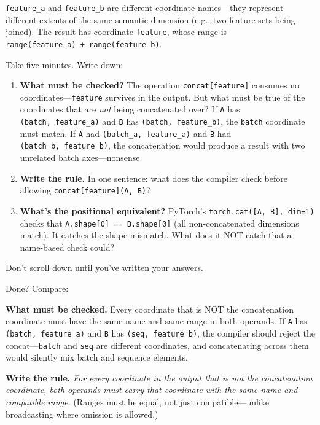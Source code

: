 \documentclass[11pt,titlepage]{article}
\begin{document}
\texttt{feature\_a} and \texttt{feature\_b} are different coordinate
names---they represent different extents of the same semantic dimension
(e.g., two feature sets being joined). The result has coordinate
\texttt{feature}, whose range is
\texttt{range(feature\_a)\ +\ range(feature\_b)}.

Take five minutes. Write down:

\begin{enumerate}
\def\labelenumi{\arabic{enumi}.}
\item
  \textbf{What must be checked?} The operation
  \texttt{concat{[}feature{]}} consumes no
  coordinates---\texttt{feature} survives in the output. But what must
  be true of the coordinates that are \emph{not} being concatenated
  over? If \texttt{A} has \texttt{(batch,\ feature\_a)} and \texttt{B}
  has \texttt{(batch,\ feature\_b)}, the \texttt{batch} coordinate must
  match. If \texttt{A} had \texttt{(batch\_a,\ feature\_a)} and
  \texttt{B} had \texttt{(batch\_b,\ feature\_b)}, the concatenation
  would produce a result with two unrelated batch axes---nonsense.
\item
  \textbf{Write the rule.} In one sentence: what does the compiler check
  before allowing \texttt{concat{[}feature{]}(A,\ B)}?
\item
  \textbf{What's the positional equivalent?} PyTorch's
  \texttt{torch.cat({[}A,\ B{]},\ dim=1)} checks that
  \texttt{A.shape{[}0{]}\ ==\ B.shape{[}0{]}} (all non-concatenated
  dimensions match). It catches the shape mismatch. What does it NOT
  catch that a name-based check could?
\end{enumerate}

Don't scroll down until you've written your answers.

\vspace{2em}

Done? Compare:

\textbf{What must be checked.} Every coordinate that is NOT the
concatenation coordinate must have the same name and same range in both
operands. If \texttt{A} has \texttt{(batch,\ feature\_a)} and \texttt{B}
has \texttt{(seq,\ feature\_b)}, the compiler should reject the
concat---\texttt{batch} and \texttt{seq} are different coordinates, and
concatenating across them would silently mix batch and sequence
elements.

\textbf{Write the rule.} \emph{For every coordinate in the output that
is not the concatenation coordinate, both operands must carry that
coordinate with the same name and compatible range.} (Ranges must be
equal, not just compatible---unlike broadcasting where omission is
allowed.)
\end{document}
